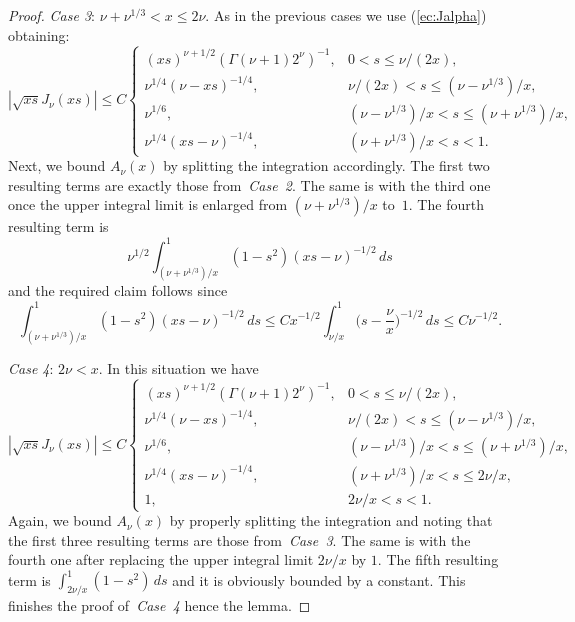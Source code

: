 \documentclass[leqno,a4paper]{amsart}
\begin{document}
\begin{proof}
\textit{Case 3}: $\nu+\nu^{1/3}<x\le 2\nu$.
As in the previous cases we use (\ref{ec:Jalpha}) obtaining:
\begin{equation*}
|\sqrt{xs}J_\nu(xs)|\le C
\begin{cases}
(xs)^{\nu+1/2}(\Gamma(\nu+1)2^{\nu})^{-1},
& 0<s\le \nu/(2x),\\
\nu^{1/4}(\nu-xs)^{-1/4},
& \nu/(2x) < s \le (\nu-\nu^{1/3})/x,\\
\nu^{1/6},
& (\nu-\nu^{1/3})/x < s \le (\nu+\nu^{1/3})/x,\\
\nu^{1/4}(xs-\nu)^{-1/4},
& (\nu+\nu^{1/3})/x<s<1.
\end{cases}
\end{equation*}
Next, we bound $A_\nu(x)$ by splitting the integration accordingly. The first
two resulting terms are exactly those from~\textit{Case~2}. The same is with
the third one once the upper integral limit is enlarged from
$(\nu+\nu^{1/3})/x$ to~$1$. The fourth resulting term is
\begin{equation*}
\nu^{1/2}\int_{(\nu+\nu^{1/3})/x}^1(1-s^2) (xs-\nu)^{-1/2}\,ds
\end{equation*}
and the required claim follows since
\begin{equation*}
\int_{(\nu+\nu^{1/3})/x}^1(1-s^2)(xs-\nu)^{-1/2}\,ds\le Cx^{-1/2}
\int_{\nu/x}^1\Big(s-\frac{\nu}x\Big)^{-1/2}\,ds
\le C \nu^{-1/2}.
\end{equation*}

\textit{Case 4}: $2\nu<x$. In this situation we have
\begin{equation*}
|\sqrt{xs}J_\nu(xs)| \le C
\begin{cases}
(xs)^{\nu+1/2}(\Gamma(\nu+1)2^{\nu})^{-1},
& 0 < s \le \nu/(2x),\\
\nu^{1/4}(\nu-xs)^{-1/4},
& \nu/(2x) < s \le (\nu-\nu^{1/3})/x,\\
\nu^{1/6},
& (\nu-\nu^{1/3})/x < s \le(\nu+\nu^{1/3})/x,\\
\nu^{1/4}(xs-\nu)^{-1/4},
& (\nu+\nu^{1/3})/x < s \le 2\nu/x,\\
1, & 2\nu/x<s<1.
\end{cases}
\end{equation*}
Again, we bound $A_\nu(x)$ by properly splitting the integration and noting
that the first three resulting terms are those from~\textit{Case~3}. The same is with
the fourth one after replacing the upper integral limit $2\nu/x$ by $1$.
The fifth resulting term is $\int_{2\nu/x}^1(1-s^2)\,ds$ and it is
obviously bounded by a constant. This finishes the proof of~\textit{Case~4}
hence the lemma.
\end{proof}
\end{document}
